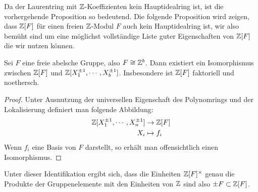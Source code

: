 Da der Laurentring mit $\mathbb{Z}$-Koeffizienten kein Hauptidealring ist, ist die vorhergehende Proposition so bedeutend. Die folgende Proposition wird zeigen, dass $\mathbb{Z}[F]$ für einen freien $\mathbb{Z}$-Modul $F$ auch kein Hauptidealring ist, wir also bemüht sind um eine möglichst vollständige Liste guter Eigenschaften von $\mathbb{Z}[F]$ die wir nutzen können.

\begin{prop}
\label{prop:gruppenringnoethersch}
	Sei $F$ eine freie abelsche Gruppe, also $F\cong \mathbb{Z}^b$. Dann existiert ein Isomorphismus zwischen $\mathbb{Z}[F]$ und $\mathbb{Z}[X_1^{\pm 1},\cdots,X_{b}^{\pm 1}] $. Insbesondere ist $\mathbb{Z}[F]$ faktoriell und noethersch.
\end{prop}
\begin{proof}
	Unter Ausnutzung der universellen Eigenschaft des Polynomrings und der Lokalisierung definiert man folgende Abbildung:
	\begin{align*}
			\mathbb{Z}[X_1^{\pm 1},\cdots,X_{n}^{\pm 1}] & \to  \mathbb{Z}[F]\\
			X_i &\mapsto  f_i
	\end{align*}
	Wenn $f_i$ eine Basis von $F$ darstellt, so erhält man offensichtlich einen Isomorphismus.
\end{proof}

\begin{bem}
\label{bem:einheitengruppenring}
	Unter dieser Identifikation ergibt sich, dass die Einheiten $\mathbb{Z}[F]^\times$ genau die Produkte der Gruppenelemente mit den Einheiten von $\mathbb{Z}$ sind also $\pm F \subset \mathbb{Z}[F]$.
\end{bem}

